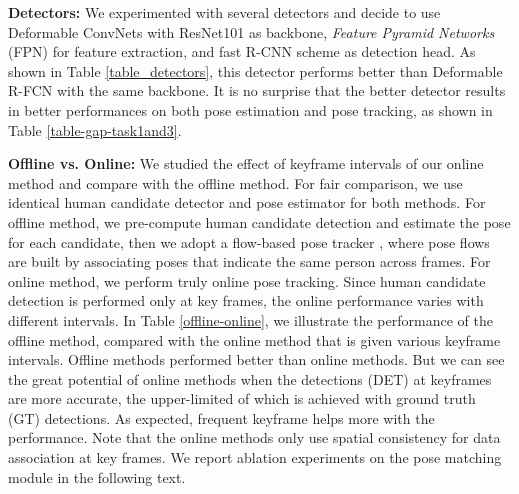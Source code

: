 \documentclass[10pt,twocolumn,letterpaper]{article}
\begin{document}
	\noindent\textbf{Detectors:} 
	We experimented with several detectors and decide to use Deformable ConvNets with ResNet101 as backbone, \textit{Feature Pyramid Networks} (FPN) for feature extraction, and fast R-CNN scheme as detection head. As shown in Table \ref{table_detectors}, this detector performs better than Deformable R-FCN with the same backbone. It is no surprise that the better detector results in better performances on both pose estimation and pose tracking, as shown in Table \ref{table-gap-task1and3}.
	
	
	\noindent\textbf{Offline vs. Online:} 
	We studied the effect of keyframe intervals of our online method and compare with the offline method. 
For fair comparison, we use identical human candidate detector and pose estimator for both methods. For offline method, we pre-compute human candidate detection and estimate the pose for each candidate, then we adopt a flow-based pose tracker \cite{xiu2018pose}, where pose flows are built by associating poses that indicate the same person across frames.
For online method, we perform truly online pose tracking. Since human candidate detection is performed only at key frames, the online performance varies with different intervals.
	In Table \ref{offline-online}, we illustrate the performance of the offline method, compared with the online method that is given various keyframe intervals. Offline methods performed better than online methods. But we can see the great potential of online methods when the detections (DET) at keyframes are more accurate, the upper-limited of which is achieved with ground truth (GT) detections. As expected, frequent keyframe helps more with the performance. 
	Note that the online methods only use spatial consistency for data association at key frames. We report ablation experiments on the pose matching module in the following text.
	
\end{document}
